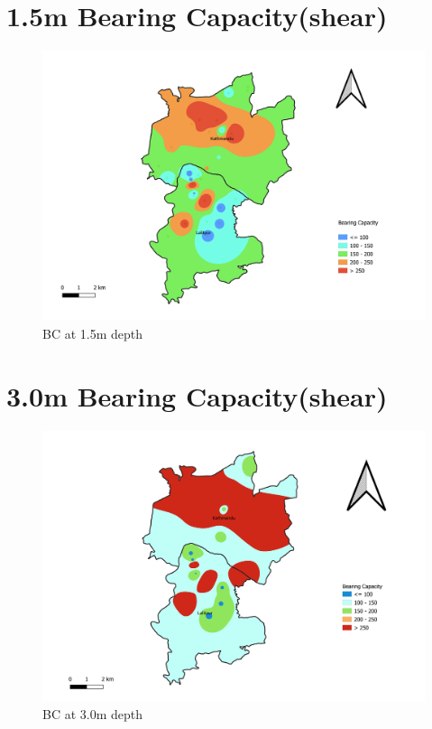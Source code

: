\section{1.5m Bearing Capacity(shear)}
\begin{figure}[!hbt]
\centering
\includegraphics[width=\linewidth, height=\textheight,keepaspectratio]{in/map/Shear_1_5.png}
\caption{BC at 1.5m depth}
\end{figure}
\pagebreak

\section{3.0m Bearing Capacity(shear)}
\begin{figure}[!hbt]
\centering
\includegraphics[width=\linewidth, height=\textheight,keepaspectratio]{in/map/Shear_3_0.png}
\caption{BC at 3.0m depth}
\end{figure}
\pagebreak

